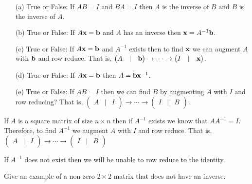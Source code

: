 \begin{problem}
    \begin{enumerate}
        \item[(a)] True or False: If $AB = I$ and $BA = I$ then $A$ is the inverse of $B$
            and $B$ is the inverse of $A$. 
        \item[(b)] True or False: If $A{\bf x} = {\bf b}$ and $A$ has an inverse then ${\bf x} =
            A^{-1} {\bf b}$.
        \item[(c)] True or False: If $A {\bf x} = {\bf b}$ and $A^{-1}$ exists then to find ${\bf x}$ we can augment $A$
            with ${\bf b}$ and row reduce.  That is, $\begin{pmatrix} A & | & {\bf b}
            \end{pmatrix} \to \cdots \to \begin{pmatrix} I & | & {\bf x}
            \end{pmatrix}$.
        \item[(d)] True or False: If $A {\bf x} = {\bf b}$ then $A = {\bf b} {\bf x}^{-1}$.
        \item[(e)] True or False: If $AB = I$ then we can find $B$ by augmenting $A$ with $I$ and row
            reducing?  That is, $\begin{pmatrix} A & | & I \end{pmatrix} \to \cdots \to
            \begin{pmatrix} I & | & B \end{pmatrix}$. 
    \end{enumerate}
\end{problem}

\begin{technique}
    If $A$ is a square matrix of size $n \times n$ then if $A^{-1}$ exists we know that
    $AA^{-1} = I$.  Therefore, to find $A^{-1}$ we augment $A$ with $I$ and row reduce.
    That is, $\begin{pmatrix} A & | & I \end{pmatrix} \to \cdots \to \begin{pmatrix} I & |
        & B \end{pmatrix}$

    If $A^{-1}$ does not exist then we will be unable to row reduce to the identity.
\end{technique}

\begin{problem}
    Give an example of a non zero $2 \times 2$ matrix that does not have an inverse.
\end{problem}
\solution{
    \[ A = \begin{pmatrix} 1 & 0 \\ 0 & 0 \end{pmatrix} \]
}

